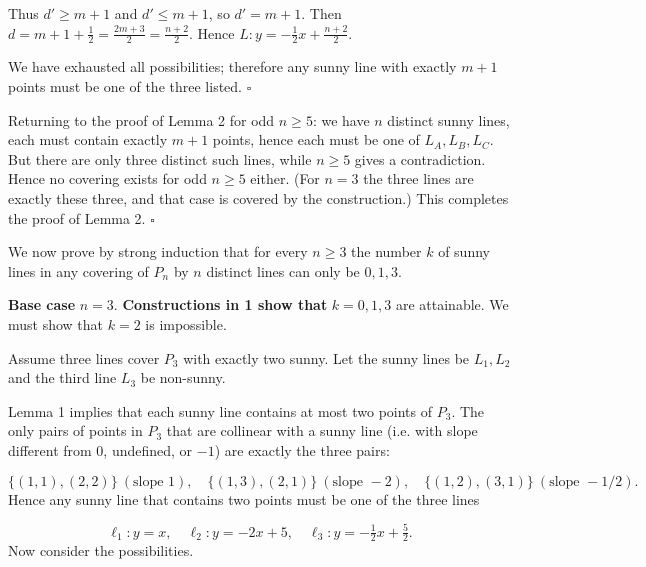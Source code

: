 Thus \(d' \ge m+1\) and \(d' \le m+1\), so \(d' = m+1\). Then \(d = m+1 + \tfrac12 = \tfrac{2m+3}{2} = \tfrac{n+2}{2}\). Hence \(L: y = -\tfrac12 x + \tfrac{n+2}{2}\).\par
\smallskip
We have exhausted all possibilities; therefore any sunny line with exactly \(m+1\) points must be one of the three listed. \(\square\)\par
Returning to the proof of Lemma 2 for odd \(n\ge 5\): we have \(n\) distinct sunny lines, each must contain exactly \(m+1\) points, hence each must be one of \(L_A, L_B, L_C\). But there are only three distinct such lines, while \(n \ge 5\) gives a contradiction. Hence no covering exists for odd \(n\ge 5\) either. (For \(n=3\) the three lines are exactly these three, and that case is covered by the construction.) This completes the proof of Lemma 2. \(\square\)\par
\smallskip
{}
We now prove by strong induction that for every \(n\ge 3\) the number \(k\) of sunny lines in any covering of \(P_n\) by \(n\) distinct lines can only be \(0,1,3\).\par
\textbf{Base case }\(n = 3\).\textbf{ Constructions in 1 show that }\(k = 0,1,3\) are attainable. We must show that \(k = 2\) is impossible.\par
Assume three lines cover \(P_3\) with exactly two sunny. Let the sunny lines be \(L_1, L_2\) and the third line \(L_3\) be non-sunny.\par
Lemma 1 implies that each sunny line contains at most two points of \(P_3\). The only pairs of points in \(P_3\) that are collinear with a sunny line (i.e. with slope different from \(0\), undefined, or \(-1\)) are exactly the three pairs:\par
\[
\{(1,1),(2,2)\}\ (\text{slope }1),\quad \{(1,3),(2,1)\}\ (\text{slope }-2),\quad \{(1,2),(3,1)\}\ (\text{slope }-1/2).
\]
Hence any sunny line that contains two points must be one of the three lines\par
\[
\ell_1: y=x,\quad \ell_2: y=-2x+5,\quad \ell_3: y=-\tfrac12 x+\tfrac52.
\]
Now consider the possibilities.\par
